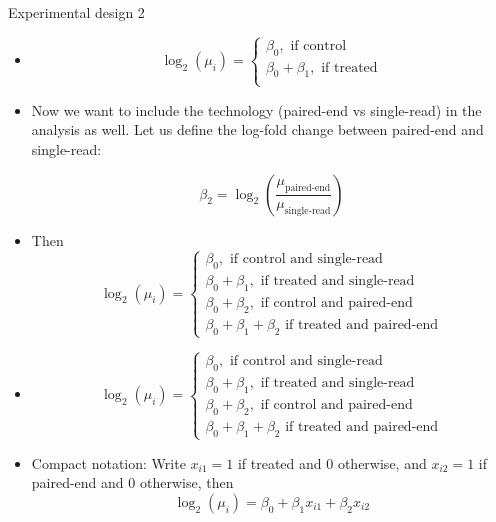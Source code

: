 \documentclass[red,xcolor={table,usenames,dvipsnames}]{beamer}
\begin{document}
\begin{frame}{Experimental design 2}

\begin{itemize}
\item $$
\log_2(\mu_i)=
\begin{cases}
\beta_0, \text{ if control}\\
\beta_0 + \beta_1,\text{ if treated}\\
\end{cases}
$$
\item Now we want to include the technology (paired-end vs single-read) in the analysis as well. Let us define the log-fold change between paired-end and single-read:

$$ \beta_2 = \log_2\left(\frac{\mu_{\text{paired-end}}}{\mu_{\text{single-read}}} \right) $$


\item Then
 $$
\log_2(\mu_i)=
\begin{cases}
\beta_0, \text{ if control and single-read}\\
\beta_0 + \beta_1, \text{ if treated and single-read}\\
\beta_0 + \beta_2, \text{ if control and paired-end}\\
\beta_0 + \beta_1 + \beta_2 \text{ if treated and paired-end}
\end{cases}
$$

\end{itemize}

\end{frame}

\begin{frame}
\begin{itemize}
  \item
 $$
\log_2(\mu_i)=
\begin{cases}
\beta_0, \text{ if control and single-read}\\
\beta_0 + \beta_1, \text{ if treated and single-read}\\
\beta_0 + \beta_2, \text{ if control and paired-end}\\
\beta_0 + \beta_1 + \beta_2 \text{ if treated and paired-end}
\end{cases}
$$
\item Compact notation: Write $x_{i1} = 1$ if treated and $0$ otherwise, and $x_{i2}=1$ if paired-end and $0$ otherwise, then
$$\log_2(\mu_i) = \beta_0 + \beta_1 x_{i1} + \beta_2 x_{i2}$$
\end{itemize}
\end{frame}
\end{document}
